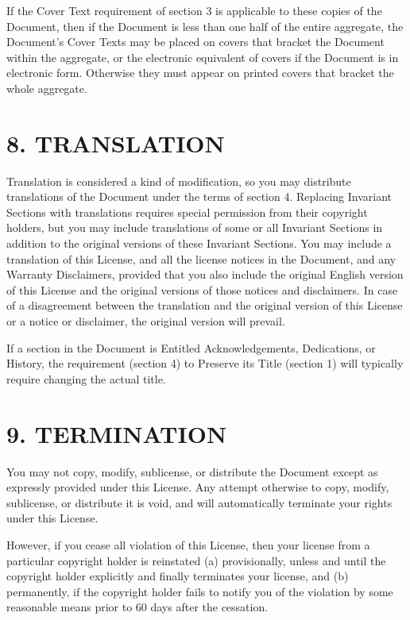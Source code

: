 \documentclass[captions=tableheading]{scrbook}
\begin{document}
If the Cover Text requirement of section 3 is applicable to these copies of the Document, then if the Document is less than one half of the entire aggregate, the Document's Cover Texts may be placed on covers that bracket the Document within the aggregate, or the electronic equivalent of covers if the Document is in electronic form. Otherwise they must appear on printed covers that bracket the whole aggregate.
\section{8. TRANSLATION}
\label{sec-18-9}


Translation is considered a kind of modification, so you may distribute translations of the Document under the terms of section 4. Replacing Invariant Sections with translations requires special permission from their copyright holders, but you may include translations of some or all Invariant Sections in addition to the original versions of these Invariant Sections. You may include a translation of this License, and all the license notices in the Document, and any Warranty Disclaimers, provided that you also include the original English version of this License and the original versions of those notices and disclaimers. In case of a disagreement between the translation and the original version of this License or a notice or disclaimer, the original version will prevail.

If a section in the Document is Entitled Acknowledgements, Dedications, or History, the requirement (section 4) to Preserve its Title (section 1) will typically require changing the actual title.
\section{9. TERMINATION}
\label{sec-18-10}


You may not copy, modify, sublicense, or distribute the Document except as expressly provided under this License. Any attempt otherwise to copy, modify, sublicense, or distribute it is void, and will automatically terminate your rights under this License.

However, if you cease all violation of this License, then your license from a particular copyright holder is reinstated (a) provisionally, unless and until the copyright holder explicitly and finally terminates your license, and (b) permanently, if the copyright holder fails to notify you of the violation by some reasonable means prior to 60 days after the cessation.
\end{document}
